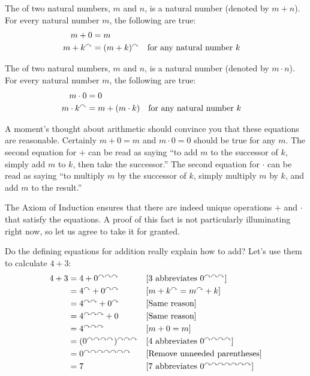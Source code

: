 \begin{defn}\label{def:NatArithmetic}
\noindent The  of two natural numbers, $m$ and $n$, is a natural number (denoted by $m+n$). For every natural number $m$, the following 
are true:
\begin{align*}
    m + 0     &= m\\
    m + k^\curvearrowright &= (m + k)^\curvearrowright &&\text{for any natural number $k$}
\end{align*}

\noindent The  of two natural numbers, $m$ and $n$, is a natural number 
(denoted by $m\cdot n$). For every natural number $m$, the following are true:
\begin{align*}
  m\cdot 0 &= 0\\
  m\cdot k^\curvearrowright &= m + (m\cdot k) &&\text{for any natural number $k$}
\end{align*}
\end{defn}


A moment's thought about arithmetic should convince you that these equations are reasonable.
Certainly $m+0=m$ and $m\cdot 0 = 0$ should be true for any $m$. 
The second equation for $+$ can be read as saying ``to add $m$ to the successor of $k$, simply add $m$ to $k$, then take the successor.''
The second equation for $\cdot$ can be read as saying ``to multiply $m$ by the successor of $k$, simply multiply $m$ by $k$, and add $m$ to the result.''

The Axiom of Induction ensures that there are indeed unique operations $+$ and $\cdot$ that satisfy the equations.
A proof of this fact is not particularly illuminating right now, so let us agree to take it for granted.

\begin{example}
Do the defining equations for addition really explain how to add? Let's use them to calculate
$4+3$:
\begin{align*}
  4 + 3 &= 4 + 0^{\curvearrowright\curvearrowright\curvearrowright}&&\text{[$3$ abbreviates $0^{\curvearrowright\curvearrowright\curvearrowright}$]}\\
  &= 4^\curvearrowright + 0^{\curvearrowright\curvearrowright} &&\text{[$m + k^\curvearrowright = m^\curvearrowright+k$]}\\
  &= 4^{\curvearrowright\curvearrowright} + 0^\curvearrowright &&\text{[Same reason]}\\
  &= 4^{\curvearrowright\curvearrowright\curvearrowright} + 0 &&\text{[Same reason]}\\
  &= 4^{\curvearrowright\curvearrowright\curvearrowright} &&\text{[$m+0 = m$]}\\
  &= (0^{\curvearrowright\curvearrowright\curvearrowright\curvearrowright})^{\curvearrowright\curvearrowright\curvearrowright} && \text{[$4$ abbreviates $0^{\curvearrowright\curvearrowright\curvearrowright\curvearrowright}$]}\\
  &= 0^{\curvearrowright\curvearrowright\curvearrowright\curvearrowright\curvearrowright\curvearrowright\curvearrowright} && \text{[Remove unneeded parentheses]}\\
  &= 7 &&\text{[$7$ abbreviates $0^{\curvearrowright\curvearrowright\curvearrowright\curvearrowright\curvearrowright\curvearrowright\curvearrowright}$]}
\end{align*}
\end{example}
\ipadbreak

